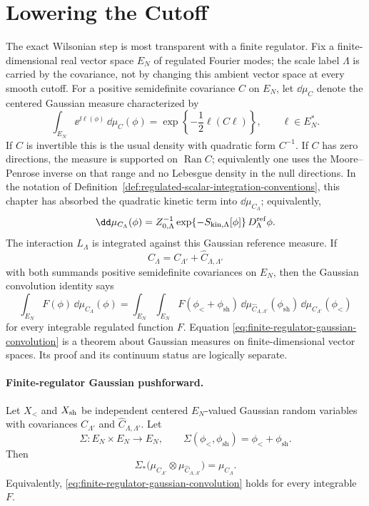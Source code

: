 \section{Lowering the Cutoff}

The exact Wilsonian step is most transparent with a finite regulator.  Fix a
finite-dimensional real vector space \(E_N\) of regulated Fourier modes; the
scale label \(\Lambda\) is carried by the covariance, not by changing this
ambient vector space at every smooth cutoff.  For a positive semidefinite
covariance \(C\) on \(E_N\), let \(\dd\mu_C\) denote the centered Gaussian
measure characterized by
\[
  \int_{E_N}\ee^{\ii\ell(\phi)}\,\dd\mu_C(\phi)
  =
  \exp\!\left\{-\frac12\ell(C\ell)\right\},
  \qquad \ell\in E_N^* .
\]
If \(C\) is invertible this is the usual density with quadratic form
\(C^{-1}\).  If \(C\) has zero directions, the measure is supported on
\(\operatorname{Ran}C\); equivalently one uses the Moore--Penrose inverse on
that range and no Lebesgue density in the null directions.  In the notation of
Definition~\ref{def:regulated-scalar-integration-conventions}, this chapter has
absorbed the quadratic kinetic term into \(\dd\mu_{C_\Lambda}\); equivalently,
\[
  \dd\mu_{C_\Lambda}(\phi)
  =
  Z_{0,\Lambda}^{-1}
  \exp\{-S_{\rm kin,\Lambda}[\phi]\}\,
  D_\Lambda^{\rm ref}\phi .
\]
The interaction \(L_\Lambda\) is integrated against this Gaussian reference
measure.  If
\[
  C_\Lambda=C_{\Lambda'}+\widehat C_{\Lambda,\Lambda'}
\]
with both summands positive semidefinite covariances on \(E_N\), then the
Gaussian convolution identity says
\begin{equation}
  \int_{E_N}F(\phi)\,\dd\mu_{C_\Lambda}(\phi)
  =
  \int_{E_N}\int_{E_N}
  F(\phi_<+\phi_{\mathrm{sh}})\,
  \dd\mu_{\widehat C_{\Lambda,\Lambda'}}(\phi_{\mathrm{sh}})\,
  \dd\mu_{C_{\Lambda'}}(\phi_<)
  \label{eq:finite-regulator-gaussian-convolution}
\end{equation}
for every integrable regulated function \(F\).  Equation
\eqref{eq:finite-regulator-gaussian-convolution} is a theorem about Gaussian
measures on finite-dimensional vector spaces.  Its proof and its continuum
status are logically separate.

\paragraph{Finite-regulator Gaussian pushforward.}
Let \(X_<\) and \(X_{\rm sh}\) be independent centered \(E_N\)-valued Gaussian
random variables with covariances \(C_{\Lambda'}\) and
\(\widehat C_{\Lambda,\Lambda'}\).  Let
\[
  \Sigma:E_N\times E_N\longrightarrow E_N,\qquad
  \Sigma(\phi_<,\phi_{\mathrm{sh}})=\phi_<+\phi_{\mathrm{sh}} .
\]
Then
\[
  \Sigma_*
  \bigl(\mu_{C_{\Lambda'}}\otimes
        \mu_{\widehat C_{\Lambda,\Lambda'}}\bigr)
  =
  \mu_{C_\Lambda}.
\]
Equivalently, \eqref{eq:finite-regulator-gaussian-convolution} holds for every
integrable \(F\).

